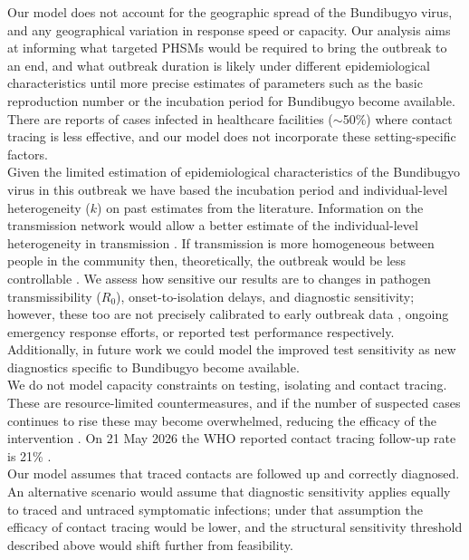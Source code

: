 \documentclass[12pt, letterpaper]{article}
\begin{document}
Our model does not account for the geographic spread of the Bundibugyo virus, and any geographical variation in response speed or capacity. Our analysis aims at informing what targeted PHSMs would be required to bring the outbreak to an end, and what outbreak duration is likely under different epidemiological characteristics until more precise estimates of parameters such as the basic reproduction number or the incubation period for Bundibugyo become available. There are reports of cases infected in healthcare facilities ($\sim$50\%) where contact tracing is less effective, and our model does not incorporate these setting-specific factors. \\

Given the limited estimation of epidemiological characteristics of the Bundibugyo virus in this outbreak we have based the incubation period and individual-level heterogeneity ($k$) on past estimates from the literature. Information on the transmission network would allow a better estimate of the individual-level heterogeneity in transmission \citep{Althaus2015}. If transmission is more homogeneous between people in the community then, theoretically, the outbreak would be less controllable \citep{lloydsmith2005superspreading}. We assess how sensitive our results are to changes in pathogen transmissibility ($R_0$), onset-to-isolation delays, and diagnostic sensitivity; however, these too are not precisely calibrated to early outbreak data \citep{insp2026sitrep010}, ongoing emergency response efforts, or reported test performance respectively. Additionally, in future work we could model the improved test sensitivity as new diagnostics specific to Bundibugyo become available. \\

We do not model capacity constraints on testing, isolating and contact tracing. These are resource-limited countermeasures, and if the number of suspected cases continues to rise these may become overwhelmed, reducing the efficacy of the intervention \citep{dhillon2018contacttracing}. On 21 May 2026 the WHO reported contact tracing follow-up rate is 21\% \citep{who2026don603}. \\

Our model assumes that traced contacts are followed up and correctly diagnosed. An alternative scenario would assume that diagnostic sensitivity applies equally to traced and untraced symptomatic infections; under that assumption the efficacy of contact tracing would be lower, and the structural sensitivity threshold described above would shift further from feasibility. \\
\end{document}
